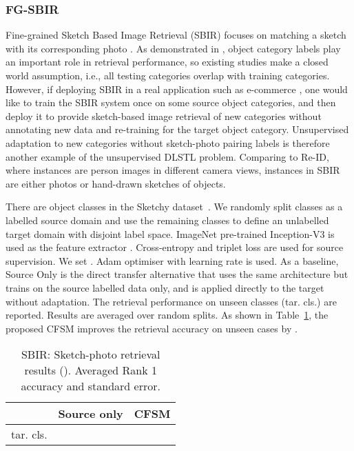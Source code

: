 \documentclass[letterpaper]{article} \usepackage{aaai19}  \usepackage{times}  \usepackage{helvet}  \usepackage{courier}  \usepackage{url}  \usepackage{graphicx}
\begin{document}
\subsubsection{FG-SBIR}
Fine-grained Sketch Based Image Retrieval (SBIR) focuses on matching a sketch with its corresponding photo \cite{sketchy2016}. As demonstrated in \cite{sketchy2016}, object category labels play an important role in retrieval performance, so existing studies make a closed world assumption, i.e., all testing categories overlap with training categories. However, if deploying SBIR in a real application such as e-commerce \cite{yu2016sketchShoe}, one would like to train the SBIR system once on some source object categories, and then deploy it to provide sketch-based image retrieval of new categories without annotating new data and re-training for the target object category. Unsupervised adaptation to new categories
without sketch-photo pairing labels is therefore  another example of the unsupervised DLSTL problem. Comparing to  Re-ID, where instances are person images in different camera views, instances in SBIR are either photos or hand-drawn sketches of objects.

There are  object classes in the Sketchy dataset~\cite{sketchy2016}. We randomly split  classes as a labelled source domain and use the remaining  classes to define an unlabelled target domain with disjoint label space. ImageNet pre-trained Inception-V3 \cite{szegedy2016rethinking} is used as the feature extractor . Cross-entropy and triplet loss are used for source supervision.  We set . Adam optimiser with learning rate  is used. As a baseline, Source Only is the direct transfer alternative that uses the same architecture but trains on the source labelled data only, and is applied directly to the target without adaptation.
The retrieval performance on unseen classes (tar. cls.) are reported. Results are averaged over  random splits.
As shown in Table~\ref{tab:DLSTL_Sketchy}, the proposed CFSM improves the retrieval accuracy on unseen cases by .

\begin{table}[htb]
\centering
\small
\begin{tabular}{c|c|c}
\hline
          & Source only        & CFSM                 \\ \hline
tar. cls. &    &     \\ \hline
\end{tabular}
\caption{SBIR: Sketch-photo retrieval results (). Averaged Rank 1 accuracy and standard error.}
\label{tab:DLSTL_Sketchy}
\end{table}
\end{document}
